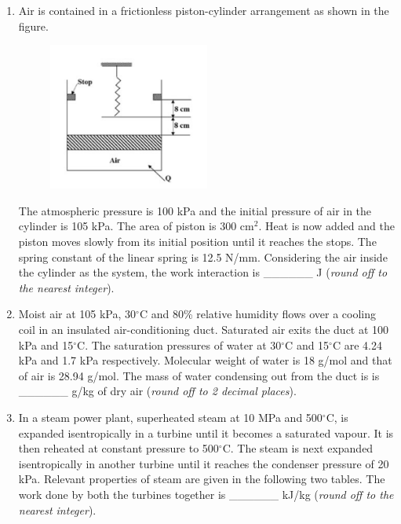 \documentclass[12pt,onecolumn]{article}
\begin{document}
\begin{enumerate}
    \item Air is contained in a frictionless piston-cylinder arrangement as shown in the figure.

          \begin{figure}[H]
              \centering
              \includegraphics[width=0.5\textwidth]{q52s2}
              \label{fig:q52s2}
          \end{figure}

          The atmospheric pressure is 100 kPa and the initial pressure of air in the cylinder is 105 kPa. The area of piston is 300 cm$^2$. Heat is now added and the piston moves slowly from its initial position until it reaches the stops. The spring constant of the linear spring is 12.5 N/mm. Considering the air inside the cylinder as the system, the work interaction is \_\_\_\_\_\_ J (\textit{round off to the nearest integer}).

    \item Moist air at 105 kPa, 30$^\circ$C and 80\% relative humidity flows over a cooling coil in an insulated air-conditioning duct. Saturated air exits the duct at 100 kPa and 15$^\circ$C. The saturation pressures of water at 30$^\circ$C and 15$^\circ$C are 4.24 kPa and 1.7 kPa respectively. Molecular weight of water is 18 g/mol and that of air is 28.94 g/mol. The mass of water condensing out from the duct is is \_\_\_\_\_\_ g/kg of dry air (\textit{round off to 2 decimal places}).

    \item In a steam power plant, superheated steam at 10 MPa and 500$^\circ$C, is expanded isentropically in a turbine until it becomes a saturated vapour. It is then reheated at constant pressure to 500$^\circ$C. The steam is next expanded isentropically in another turbine until it reaches the condenser pressure of 20 kPa. Relevant properties of steam are given in the following two tables. The work done by both the turbines together is \_\_\_\_\_\_ kJ/kg (\textit{round off to the nearest integer}).


\end{enumerate}
\end{document}
